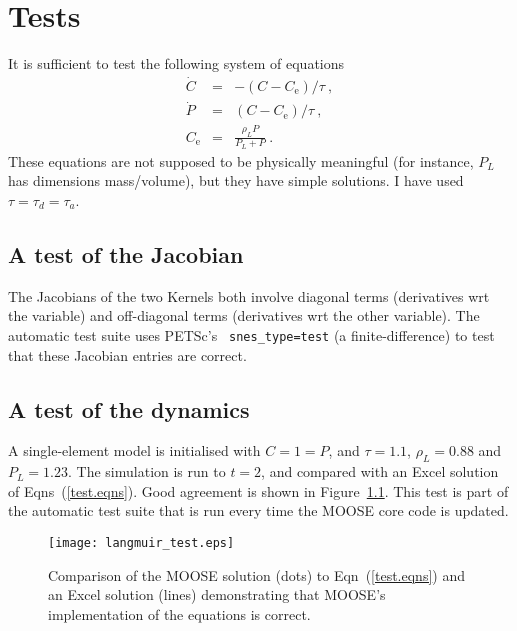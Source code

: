 \documentclass[]{scrreprt}
\begin{document}
\chapter{Tests}

It is sufficient to test the following system of equations
\begin{eqnarray}
\dot{C} & = & -(C-C_{\mathrm{e}})/\tau \ , \nonumber \\
\dot{P} & = & (C-C_{\mathrm{e}})/\tau \ , \nonumber \\
C_{\mathrm{e}} & = & \frac{\rho_{L}P}{P_{L}+P} \ .
\label{test.eqns}
\end{eqnarray}
These equations are not supposed to be physically meaningful (for
instance, $P_{L}$ has dimensions mass/volume), but they have simple
solutions.  I have used $\tau = \tau_{d} = \tau_{a}$.

\section{A test of the Jacobian}

The Jacobians of the two Kernels both involve diagonal terms
(derivatives wrt the variable) and off-diagonal terms (derivatives wrt
the other variable).  The automatic test suite uses PETSc's {\tt
  snes\_type=test} (a finite-difference) to test that these Jacobian
entries are correct.

\section{A test of the dynamics}

A single-element model is initialised with $C=1=P$, and $\tau=1.1$,
$\rho_{L}=0.88$ and $P_{L}=1.23$.  The simulation is run to $t=2$, and compared
with an Excel solution of Eqns~(\ref{test.eqns}).  Good agreement is
shown in Figure~\ref{langmuir_test.fig}.  This test is part of the
automatic test suite that is run every time the MOOSE core code is
updated.


\begin{figure}[htb]
\centering
\texttt{[image: langmuir\_test.eps]}
\caption{Comparison of the MOOSE solution (dots) to Eqn~(\ref{test.eqns}) and
  an Excel solution (lines) demonstrating that MOOSE's implementation of the
  equations is correct.}
\label{langmuir_test.fig}
\end{figure}
\end{document}
